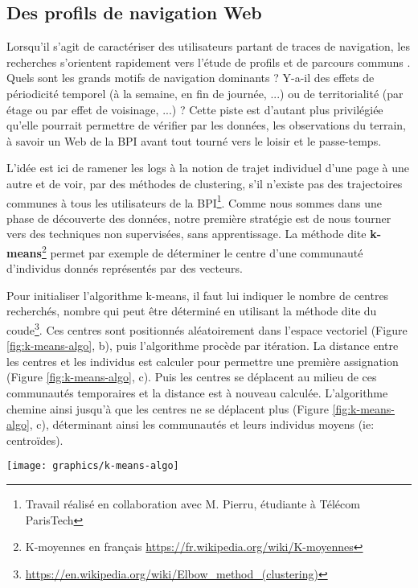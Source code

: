 \documentclass[symmetric,justified,marginals=raggedouter]{tufte-book}
\begin{document}
\subsection{Des profils de navigation Web} 

\noindent Lorsqu'il s'agit de caractériser des utilisateurs partant de traces de navigation, les recherches s'orientent rapidement vers l'étude de profils et de parcours communs \citep{feng_web_2006}. Quels sont les grands motifs de navigation dominants ? Y-a-il des effets de périodicité temporel (à la semaine, en fin de journée, ...) ou de territorialité (par étage ou par effet de voisinage, ...) ? Cette piste est d'autant plus privilégiée qu'elle pourrait permettre de vérifier par les données, les observations du terrain, à savoir un Web de la BPI avant tout tourné vers le loisir et le passe-temps.

L'idée est ici de ramener les logs à la notion de trajet individuel d'une page à une autre et de voir, par des méthodes de clustering, s'il n'existe pas des trajectoires communes à tous les utilisateurs de la BPI\footnote{Travail réalisé en collaboration avec M. Pierru, étudiante à Télécom ParisTech}. Comme nous sommes dans une phase de découverte des données, notre première stratégie est de nous tourner vers des techniques non supervisées, sans apprentissage. La méthode dite \textbf{k-means}\footnote{K-moyennes en français \url{https://fr.wikipedia.org/wiki/K-moyennes}} permet par exemple de déterminer le centre d'une communauté d'individus donnés représentés par des vecteurs.

Pour initialiser l'algorithme k-means, il faut lui indiquer le nombre de centres recherchés, nombre qui peut être déterminé en utilisant la méthode dite du coude\footnote{\url{https://en.wikipedia.org/wiki/Elbow\_method\_(clustering)}}. Ces centres sont positionnés aléatoirement dans l'espace vectoriel (Figure \ref{fig:k-means-algo}, b), puis l'algorithme procède par itération. La distance entre les centres et les individus est calculer pour permettre une première assignation (Figure \ref{fig:k-means-algo}, c). Puis les centres se déplacent au milieu de ces communautés temporaires et la distance est à nouveau calculée. L'algorithme chemine ainsi jusqu'à que les centres ne se déplacent plus (Figure \ref{fig:k-means-algo}, c), déterminant ainsi les communautés et leurs individus moyens (ie: centroïdes).

\begin{figure*}
  \texttt{[image: graphics/k-means-algo]}
  \caption{Exemple de fonctionnement de l'algorithme k-means avec 2 centres (bleu et rouge)}
  \label{fig:k-means-algo}
\end{figure*}
\end{document}
